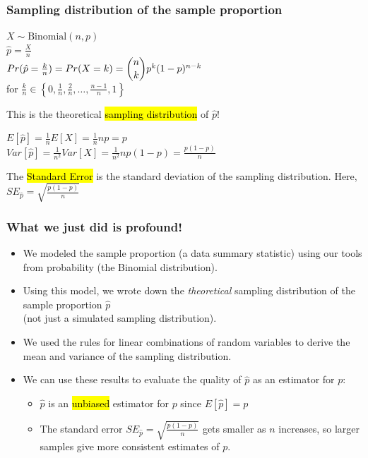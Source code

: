 \documentclass[t,compress,mathserif]{beamer}
\newcommand{\soln}[1]{\textit{#1}}
\begin{document}

\begin{frame}
\frametitle{Sampling distribution of the sample proportion}

$X \sim \text{Binomial}(n, p)$ \\
$\hat{p}  = \frac{X}{n}$ \\

\vspace{1em}
\textcolor{orange}{$Pr(\hat{p}  = \frac{k}{n}) = Pr(X = k) = \dbinom{n}{k} p^k (1-p)^{n-k}$} \\
for $\frac{k}{n} \in \left\{0, \frac{1}{n}, \frac{2}{n}, \ldots, \frac{n-1}{n}, 1\right\}$


This is the theoretical \hl{sampling distribution} of $\hat{p}$!
\vspace{1em}

\soln{
$E[\hat{p}] = \frac{1}{n}E[X] = \frac{1}{n}np = p$\\
$Var[\hat{p}] = \frac{1}{n^2}Var[X] = \frac{1}{n^2}np(1-p) = \frac{p(1-p)}{n}$
}
\pause

\vspace{1em}
The \hl{Standard Error} is the standard deviation of the sampling distribution. Here, $SE_{\hat{p}} = \sqrt{\frac{p(1-p)}{n}}$
\end{frame}

\begin{frame}
\frametitle{What we just did is profound!}
\begin{itemize}
    \item We modeled the sample proportion (a data summary statistic) using our tools from probability (the Binomial distribution).
    \pause
    \item Using this model, we wrote down the \emph{theoretical} sampling distribution of the sample proportion $\hat{p}$ \\
    (not just a simulated sampling distribution).
    \pause
    \item We used the rules for linear combinations of random variables to derive the mean and variance of the sampling distribution.
    \pause
    \item We can use these results to evaluate the quality of $\hat{p}$ as an estimator for $p$:
    \begin{itemize}
        \item $\hat{p}$ is an \hl{unbiased} estimator for $p$ since $E[\hat{p}] = p$
        \item The standard error $SE_{\hat{p}} = \sqrt{\frac{p(1-p)}{n}}$ gets smaller as $n$ increases, so larger samples give more consistent estimates of $p$.
    \end{itemize}
\end{itemize}
\end{frame}
\end{document}
